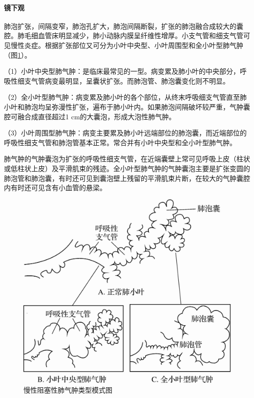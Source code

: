 \paragraph{镜下观}
肺泡扩张，间隔变窄，肺泡孔扩大，肺泡间隔断裂，扩张的肺泡融合成较大的囊腔。肺毛细血管床明显减少，肺小动脉内膜呈纤维性增厚。小支气管和细支气管可见慢性炎症。根据扩张部位又可分为小叶中央型、小叶周围型和全小叶型肺气肿（图\ref{fig7-4}）。

（1）小叶中央型肺气肿：是临床最常见的一型。病变累及肺小叶的中央部分，呼吸性细支气管病变最明显，呈囊状扩张。而肺泡管、肺泡囊变化则不明显。

（2）全小叶型肺气肿：病变累及肺小叶的各个部位，从终末呼吸细支气管直至肺小叶和肺泡均呈弥漫性扩张，遍布于肺小叶内。如果肺泡间隔破坏较严重，气肿囊腔可融合成直径超过1
cm的大囊泡，形成大泡性肺气肿。

（3）小叶周围型肺气肿：病变主要累及肺小叶远端部位的肺泡囊，而近端部位的呼吸性细支气管和肺泡管基本正常。常合并有小叶中央型和全小叶型肺气肿。

肺气肿的气肿囊泡为扩张的呼吸性细支气管，在近端囊壁上常可见呼吸上皮（柱状或低柱状上皮）及平滑肌束的残迹。全小叶型肺气肿的气肿囊泡主要是扩张变圆的肺泡管和肺泡囊，有时还可见到囊泡壁上残留的平滑肌束片断，在较大的气肿囊腔内有时还可见含有小血管的悬梁。

\begin{figure}[!htbp]
 \centering
 \includegraphics{./images/Image00113.jpg}
 \captionsetup{justification=centering}
 \caption{慢性阻塞性肺气肿类型模式图}
 \label{fig7-4}
  \end{figure} 

